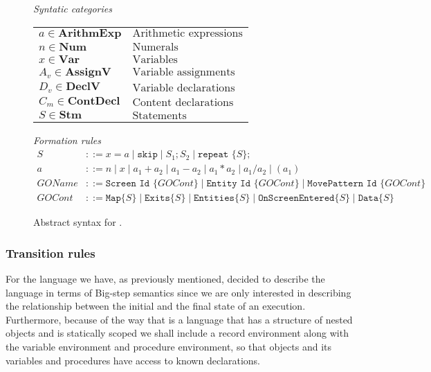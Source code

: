 \begin{figure}[htbp]
	\centering
	\textit{Syntatic categories}
	\vspace{4mm}


	\begin{tabular}{l l}
		$a \in \textbf{ArithmExp}$ & $\text{Arithmetic expressions}$ \\ 
		$n \in \textbf{Num}$ & $\text{Numerals}$ \\
		$x \in \textbf{Var}$ & $\text{Variables}$ \\
		$A_v \in \textbf{AssignV}$ & $\text{Variable assignments}$ \\
		$D_v \in \textbf{DeclV}$ & $\text{Variable declarations}$ \\
		$C_m \in \textbf{ContDecl}$ & $\text{Content declarations}$ \\
		$S \in \textbf{Stm}$ & $\text{Statements}$
	\end{tabular}

	\vspace{4mm}
	\textit{Formation rules}
	\begin{align*}
		S&::=x=a\mid \texttt{skip}\mid S_1;S_2\mid \texttt{repeat }\{S\}; \\
		a&::=n\mid x\mid a_1+a_2\mid a_1-a_2\mid a_1*a_2\mid a_1/a_2\mid (a_1) \\
		GOName&::= \texttt{Screen} \texttt{ Id } \{GOCont\} \mid \texttt{Entity} \texttt{ Id } \{GOCont\} \mid \texttt{MovePattern} \texttt{ Id } \{GOCont\} \\
		GOCont&::= \texttt{Map} \{S\} \mid \texttt{Exits} \{S\} \mid \texttt{Entities} \{S\} \mid \texttt{OnScreenEntered} \{S\} \mid \texttt{Data} \{S\}
	\end{align*}

	\caption{Abstract syntax for \dazel{}.}
	\label{fig:AbstractSyntax}
\end{figure}

\subsubsection*{Transition rules}

For the language \dazel{} we have, as previously mentioned, decided to describe the language in terms of Big-step semantics since we are only interested in describing the relationship between the initial and the final state of an execution\cite{SemanWithApplications}. Furthermore, because of the way that \dazel{} is a language that has a structure of nested objects and is statically scoped we shall include a record environment along with the variable environment and procedure environment, so that objects and its variables and procedures have access to known declarations.


